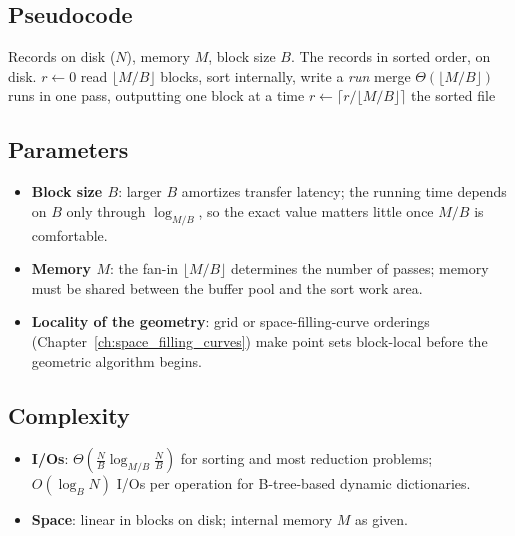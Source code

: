 \subsection{Pseudocode}

\begin{algorithm}[htbp]
\caption{External merge sort (skeleton)}
\label{alg:frontiers_external_sort}
\begin{algorithmic}[1]
\Require Records on disk ($N$), memory $M$, block size $B$.
\Ensure The records in sorted order, on disk.
  \State $r \gets 0$
  \State read $\lfloor M/B \rfloor$ blocks, sort internally, write a \emph{run}
  \Repeat
    \State merge $\Theta(\lfloor M/B \rfloor)$ runs in one pass, outputting one
           block at a time
    \State $r \gets \lceil r / \lfloor M/B \rfloor \rceil$
  \State \Return the sorted file
\EndFunction
\end{algorithmic}
\end{algorithm}

\subsection{Parameters}

\begin{itemize}
\item \textbf{Block size $B$}: larger $B$ amortizes transfer latency; the
  running time depends on $B$ only through $\log_{M/B}$, so the exact value
  matters little once $M/B$ is comfortable.
\item \textbf{Memory $M$}: the fan-in $\lfloor M/B \rfloor$ determines the
  number of passes; memory must be shared between the buffer pool and the sort
  work area.
\item \textbf{Locality of the geometry}: grid or space-filling-curve orderings
  (Chapter~\ref{ch:space_filling_curves}) make point sets block-local before
  the geometric algorithm begins.
\end{itemize}

\subsection{Complexity}

\begin{itemize}
\item \textbf{I/Os}: $\Theta(\frac{N}{B}\log_{M/B}\frac{N}{B})$ for sorting
  and most reduction problems; $O(\log_B N)$ I/Os per operation for
  B-tree-based dynamic dictionaries.
\item \textbf{Space}: linear in blocks on disk; internal memory $M$ as given.
\end{itemize}

